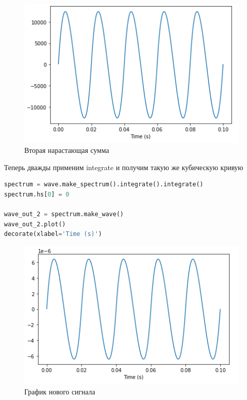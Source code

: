 \begin{figure}[H]
	\begin{center}
		\includegraphics[scale=1]{fig/lab09/lab09_09.png}
		\caption{Вторая нарастающая сумма}
	\end{center}
\end{figure}

Теперь дважды применим integrate и получим такую же кубическую кривую

\begin{lstlisting}[language=Python]
spectrum = wave.make_spectrum().integrate().integrate()
spectrum.hs[0] = 0

wave_out_2 = spectrum.make_wave()
wave_out_2.plot()
decorate(xlabel='Time (s)')
\end{lstlisting}

\begin{figure}[H]
	\begin{center}
		\includegraphics[scale=1]{fig/lab09/lab09_10.png}
		\caption{График нового сигнала}
	\end{center}
\end{figure}

